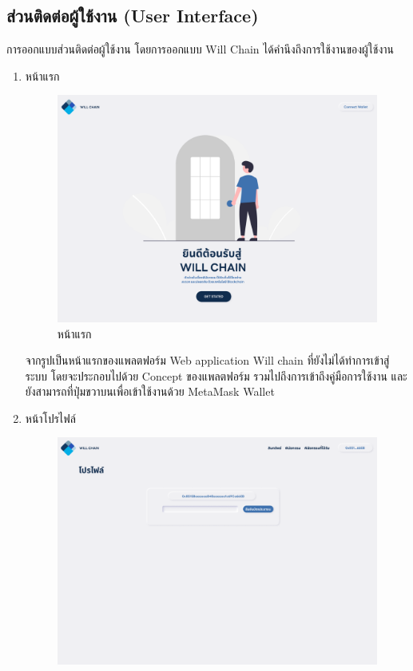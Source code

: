 \documentclass[12pt,oneside,openright,a4paper]{cpe-thai-project}
\begin{document}
\subsection{ส่วนติดต่อผู้ใช้งาน (User Interface)}
\tab การออกแบบส่วนติดต่อผู้ใช้งาน โดยการออกแบบ Will Chain ได้คำนึงถึงการใช้งานของผู้ใช้งาน 
	\begin{enumerate}[label=\thesubsection.\arabic*,leftmargin=0pt,itemindent=2.5cm]
		\item หน้าแรก
		\begin{figure}[!thb]
			\centering
			\includegraphics[scale=0.25]{Home}
			\caption{หน้าแรก}
		\end{figure}
		\FloatBarrier
		\tab จากรูปเป็นหน้าแรกของแพลตฟอร์ม Web application Will chain ที่ยังไม่ได้ทำการเข้าสู่ระบบ โดยจะประกอบไปด้วย Concept ของแพลตฟอร์ม รวมไปถึงการเข้าถึงคู่มือการใช้งาน และยังสามารถที่ปุ่มขวาบนเพื่อเข้าใช้งานด้วย MetaMask Wallet
		\item หน้าโปรไฟล์
		\begin{figure}[!thb]
			\centering
			\includegraphics[scale=0.25]{profile}

\end{figure}
\end{enumerate}
\end{document}
